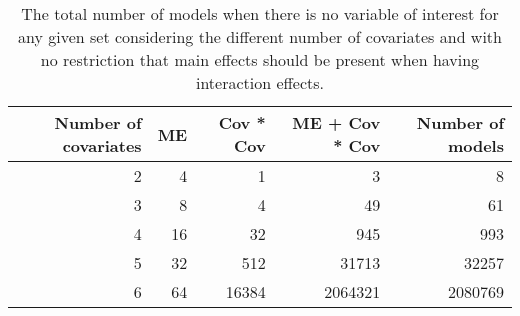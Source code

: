 \begin{table}[!h]
\centering
\caption{The total number of models when there is no variable of interest for any given set considering the different number of covariates and with no restriction that main effects should be present when having interaction effects.} 
\begin{tabular}{rrrrr}
  \hline
Number of covariates & ME & Cov * Cov & ME + Cov * Cov & Number of models \\ 
  \hline
2 & 4 & 1 & 3 & 8 \\ 
  3 & 8 & 4 & 49 & 61 \\ 
  4 & 16 & 32 & 945 & 993 \\ 
  5 & 32 & 512 & 31713 & 32257 \\ 
  6 & 64 & 16384 & 2064321 & 2080769 \\ 
   \hline
\end{tabular}
\end{table}
